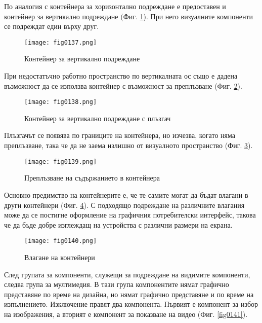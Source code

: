 По аналогия с контейнера за хоризонтално подреждане е предоставен и контейнер за вертикално подреждане (Фиг. \ref{fig0137}). При него визуалните компоненти се подреждат един върху друг.

\begin{figure}[H]
  \centering
  \texttt{[image: fig0137.png]}
  \caption{Контейнер за вертикално подреждане}
\label{fig0137}
\end{figure}

При недостатъчно работно пространство по вертикалната ос също е дадена възможност да се използва контейнер с възможност за преплъзване (Фиг. \ref{fig0138}).

\begin{figure}[H]
  \centering
  \texttt{[image: fig0138.png]}
  \caption{Контейнер за вертикално подреждане с плъзгач}
\label{fig0138}
\end{figure}

Плъзгачът се появява по границите на контейнера, но изчезва, когато няма преплъзване, така че да не заема излишно от визуалното пространство (Фиг. \ref{fig0139}).

\begin{figure}[H]
  \centering
  \texttt{[image: fig0139.png]}
  \caption{Преплъзване на съдържанието в контейнера}
\label{fig0139}
\end{figure}

Основно предимство на контейнерите е, че те самите могат да бъдат влагани в други контейнери (Фиг. \ref{fig0140}). С подходящо подреждане на различните влагания може да се постигне оформление на графичния потребителски интерфейс, такова че да бъде добре изглеждащ на устройства с различни размери на екрана.

\begin{figure}[H]
  \centering
  \texttt{[image: fig0140.png]}
  \caption{Влагане на контейнери}
\label{fig0140}
\end{figure}

След групата за компоненти, служещи за подреждане на видимите компоненти, следва група за мултимедия. В тази група компонентите нямат графично представяне по време на дизайна, но нямат графично представяне и по време на изпълнението. Изключение правят два компонента. Първият е компонент за избор на изображения, а вторият е компонент за показване на видео (Фиг. \ref{fig0141}).

